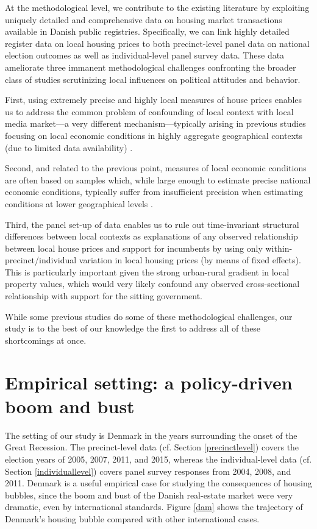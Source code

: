 \documentclass[12pt,a4paper]{article}
\begin{document}
At the methodological level, we contribute to the existing literature by exploiting uniquely detailed and comprehensive data on housing market transactions available in Danish public registries. Specifically, we can link highly detailed register data on local housing prices to both precinct-level panel data on national election outcomes as well as individual-level panel survey data. These data ameliorate three immanent methodological challenges confronting the broader class of studies scrutinizing local influences on political attitudes and behavior.

First, using extremely precise and highly local measures of house prices enables us to address the common problem of confounding of local context with local media market—a very different mechanism—typically arising in previous studies focusing on local economic conditions in highly aggregate geographical contexts (due to limited data availability) \citep[][]{bisgaard2016reconsidering}.  

Second, and related to the previous point,  measures of local economic conditions are often based on samples which, while large enough to estimate precise national economic conditions, typically suffer from insufficient precision when estimating conditions at lower geographical levels \citep[][]{healy2014presidential}. 

Third, the panel set-up of data enables us to rule out time-invariant structural differences between local contexts as explanations of any observed relationship between local house prices and support for incumbents by using only within-precinct/individual variation in local housing prices (by means of fixed effects). This is particularly important given the strong urban-rural gradient in local property values, which would very likely confound any observed cross-sectional relationship with support for the sitting government. 

While some previous studies do  some of these methodological challenges, our study is to the best of our knowledge the first to address all of these shortcomings at once. 



\section{Empirical setting: a policy-driven boom and bust}

The setting of our study is Denmark in the years surrounding the onset of the Great Recession. The precinct-level data (cf. Section \ref{precinctlevel}) covers the election years of 2005, 2007, 2011, and 2015, whereas the individual-level data (cf. Section \ref{individuallevel}) covers panel survey responses from 2004, 2008, and 2011. Denmark is a useful empirical case for studying the consequences of housing bubbles, since the boom and bust of the Danish real-estate market were very dramatic, even by international standards. Figure \ref{dam} shows the trajectory of Denmark's housing bubble compared with other international cases.
\end{document}
